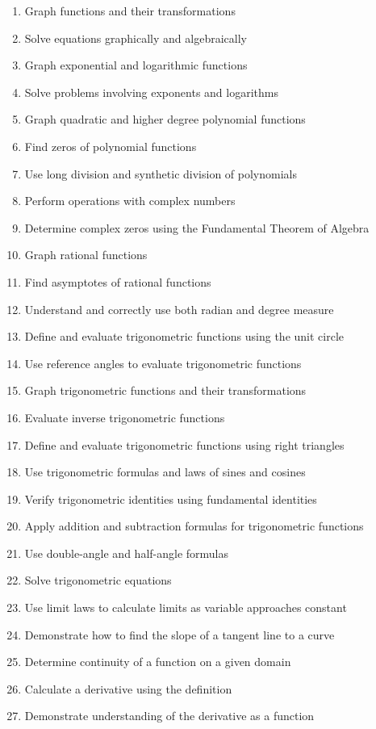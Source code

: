 \documentclass[11pt]{article}
\begin{document}
\begin{enumerate}
\item Graph functions and their transformations
\item Solve equations graphically and algebraically
\item Graph exponential and logarithmic functions
\item Solve problems involving exponents and logarithms
\item Graph quadratic and higher degree polynomial functions
\item Find zeros of polynomial functions
\item Use long division and synthetic division of polynomials
\item Perform operations with complex numbers
\item Determine complex zeros using the Fundamental Theorem of Algebra
\item Graph rational functions
\item Find asymptotes of rational functions
\item Understand and correctly use both radian and degree measure
\item Define and evaluate trigonometric functions using the unit circle
\item Use reference angles to evaluate trigonometric functions
\item Graph trigonometric functions and their transformations
\item Evaluate inverse trigonometric functions
\item Define and evaluate trigonometric functions using right triangles
\item Use trigonometric formulas and laws of sines and cosines
\item Verify trigonometric identities using fundamental identities
\item Apply addition and subtraction formulas for trigonometric functions
\item Use double-angle and half-angle formulas
\item Solve trigonometric equations
\item Use limit laws to calculate limits as variable approaches constant
\item Demonstrate how to find the slope of a tangent line to a curve
\item Determine continuity of a function on a given domain
\item Calculate a derivative using the definition
\item Demonstrate understanding of the derivative as a function

\end{enumerate}
\end{document}
